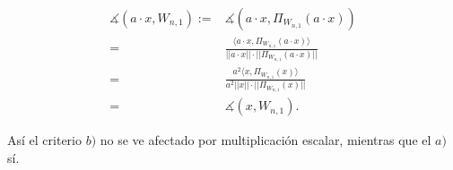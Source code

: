 \begin{align*}
\measuredangle (a \cdot x, W_{n,1}):=& \measuredangle(a \cdot x, \Pi_{W_{n,1}}(a \cdot x)) \\
= & \frac{\langle a \cdot x , \Pi_{W_{n,1}}(a \cdot x) \rangle}{|| a \cdot x || \cdot 
|| \Pi_{W_{n,1}}(a \cdot x)  ||} \\
= & \frac{a^{2}  \langle   x , \Pi_{W_{n,1}}(x) \rangle}{a^{2} ||  x || \cdot 
|| \Pi_{W_{n,1}}( x)  ||}  \\
= & \measuredangle (x, W_{n,1}).
\end{align*}


\QEDB
\vspace{0.2cm}

Así el criterio $b)$ no se ve afectado por multiplicación escalar,
mientras que el $a)$ sí.
 


